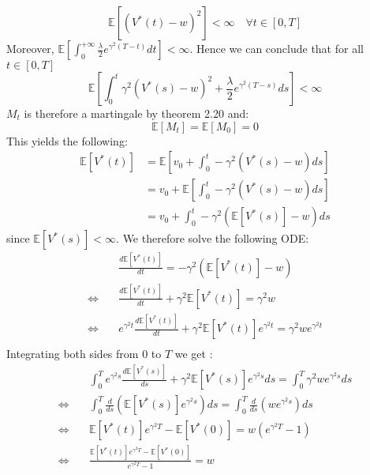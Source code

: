 \documentclass[oneside, a4paper, onecolumn, 11pt]{article}
\begin{document}
\begin{equation}
   \mathbb{E}\left[(V^*(t)-w)^2\right] < \infty \quad \forall t\in[0,T]
\end{equation}
Moreover, $\mathbb{E}\left[\int_{0}^{+\infty}\frac{\lambda}{2}e^{\gamma^2(T-t)} dt\right] < \infty$. Hence we can conclude that for all $t\in [0,T]$
\begin{equation}
\mathbb{E}\left[\int_{0}^{t}\gamma^2 \left(V^*(s) - w\right)^2 + \frac{\lambda}{2}e^{\gamma^2(T-s)}ds\right] < \infty 
\end{equation}
$M_t$ is therefore a martingale by theorem 2.20 and: 
\begin{equation}
    \mathbb{E}\left[M_t\right] = \mathbb{E}\left[M_0\right] = 0
\end{equation}
This yields the following: 
\begin{align*}
\mathbb{E}\left[V^*(t)\right] &= \mathbb{E}\left[ v_0 + \int_{0}^{t}-\gamma^2(V^*(s) - w) ds\right] \\ 
 &= v_0 + \mathbb{E}\left[\int_{0}^{t}-\gamma^2(V^*(s) - w) ds\right]\\
 &=  v_0 + \int_{0}^{t}-\gamma^2(\mathbb{E}\left[V^*(s)\right] - w) ds
\end{align*}
since $\mathbb{E}\left[V^*(s)\right] < \infty$.  
We therefore solve the following ODE: 
\begin{align*}
&\frac{d\mathbb{E}[V^*(t)]}{dt} = -\gamma^2(\mathbb{E}[V^*(t)] -w) \\
 \Leftrightarrow \quad
 &\frac{d\mathbb{E}[V^*(t)]}{dt} + \gamma^2 \mathbb{E}[V^*(t)] = \gamma^2 w \\
 \Leftrightarrow \quad
&e^{\gamma^2 t}\frac{d\mathbb{E}[V^*(t)]}{dt} + \gamma^2\mathbb{E}[V^*(t)]e^{\gamma^2t} = \gamma^2w e^{\gamma^2t}\\
\end{align*}
Integrating both sides from 0 to $T$ we get  : 
\begin{align*}
&\int_{0}^{T} e^{\gamma^2 s}\frac{d\mathbb{E}[V^*(s)]}{ds} + \gamma^2\mathbb{E}[V^*(s)]e^{\gamma^2s} ds = \int_{0}^{T} \gamma^2w e^{\gamma^2s} ds\\ 
\Leftrightarrow \quad
&\int_{0}^{T} \frac{d}{ds}(\mathbb{E}[V^*(s)]e^{\gamma^2s}){ds} = \int_{0}^{T} \frac{d}{ds}(we^{\gamma^2s}) ds\\ \Leftrightarrow \quad 
&\mathbb{E}[V^*(t)]e^{\gamma^2T} - \mathbb{E}[V^*(0)] = w(e^{\gamma^2T} -1)
\\ \Leftrightarrow \quad
&\frac{\mathbb{E}[V^*(t)]e^{\gamma^2T} - \mathbb{E}[V^*(0)]}{e^{\gamma^2T} -1} = w
\end{align*}
\end{document}
